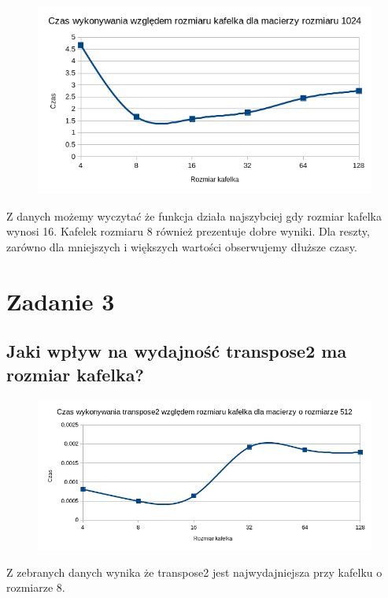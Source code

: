 \documentclass[a4paper,12pt]{mwart} %
\begin{document}
\begin{figure}[h!]
  \includegraphics[width=\linewidth]{graphs/graph1-2.png}
\end{figure}

Z danych możemy wyczytać że funkcja działa najszybciej gdy rozmiar kafelka wynosi 16. Kafelek rozmiaru 8 również prezentuje dobre wyniki. Dla reszty, zarówno dla mniejszych i większych wartości obserwujemy dłuższe czasy.



\section*{Zadanie 3}

\subsection*{Jaki wpływ na wydajność transpose2 ma rozmiar kafelka?}

\begin{figure}[h!]
  \includegraphics[width=\linewidth]{graphs/graph3-1.png}
\end{figure}

Z zebranych danych wynika że transpose2 jest najwydajniejsza przy kafelku o rozmiarze 8.
\end{document}

